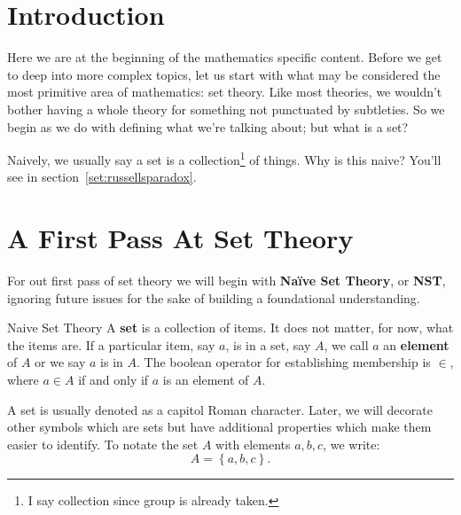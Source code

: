 \def\firstcircle{(0,0) circle (3cm)}
\def\secondcircle{(0:4cm) circle (3cm)}



\begin{center}
\end{center}

\section{Introduction}
Here we are at the beginning of the mathematics specific content.
Before we get to deep into more complex topics, let us start with what may be considered the most primitive area of mathematics: set theory.
Like most theories, we wouldn't bother having a whole theory for something not punctuated by subtleties.
So we begin as we do with defining what we're talking about; but what is a set?

Naively, we usually say a set is a collection\footnote{I say collection since group is already taken.} of things.
Why is this naive?
You'll see in section~\ref{set:russellsparadox}.

\section{A First Pass At Set Theory}
For out first pass of set theory we will begin with \textbf{Na\"ive Set Theory}, or \textbf{NST}, ignoring future issues for the sake of building a foundational understanding.

\begin{defn}{Naive Set Theory}
  A \textbf{set} is a collection of items.
  It does not matter, for now, what the items are.
  If a particular item, say $a$, is in a set, say $A$, we call $a$ an \textbf{element} of $A$ or we say $a$ is in $A$.
  The boolean operator for establishing membership is $\in$, where $a \in A$ if and only if $a$ is an element of $A$.

  A set is usually denoted as a capitol Roman character.
  Later, we will decorate other symbols which are sets but have additional properties which make them easier to identify.
  To notate the set $A$ with elements $a,b,c$, we write:
  $$
    A = \left\{ a, b, c\right\}.
  $$
\end{defn}

